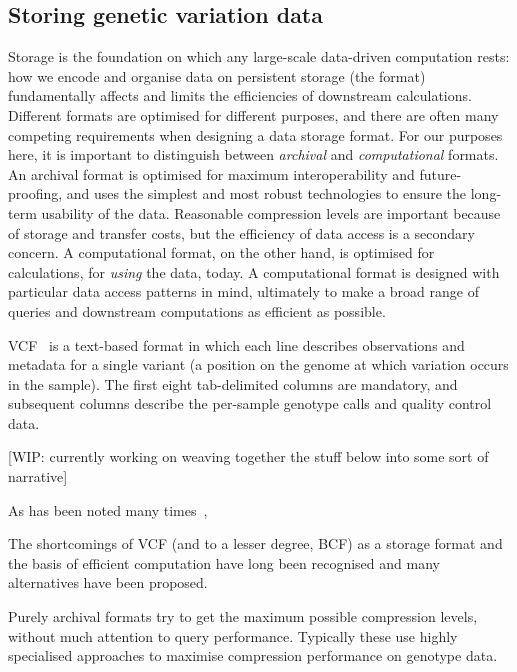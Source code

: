 \documentclass[a4paper,num-refs]{oup-contemporary}
\begin{document}
\subsection{Storing genetic variation data}
Storage is the foundation on which any large-scale data-driven computation
rests: how we encode and organise data on persistent storage (the format)
fundamentally affects and limits the efficiencies of downstream calculations.
Different formats are optimised for different purposes, and there are 
often many competing requirements when designing a data storage format.
For our  purposes here, it is important to distinguish between \emph{archival} 
and \emph{computational} formats. An archival format is optimised for 
maximum interoperability and future-proofing, and uses the simplest and 
most robust technologies to ensure the long-term usability of the data.
Reasonable compression levels are important because 
of storage and transfer costs, but the efficiency of data access is a 
secondary concern. 
A computational format, on the other hand, is optimised 
for calculations, for \emph{using} the data, today. A computational format 
is designed with particular data access patterns in mind, ultimately
to make a broad range of queries and downstream computations as efficient as 
possible.

VCF~\citep{danecek2011variant} is a text-based format in which each line 
describes observations 
and metadata for a single variant (a position on the genome at which
variation occurs in the sample). The first eight tab-delimited 
columns are mandatory, and subsequent columns describe the per-sample 
genotype calls and quality control data.

[WIP: currently working on weaving together the stuff below into
some sort of narrative]

As has been noted many times~\citep[e.g.][]{kelleher2013processing,layer2016efficient,li2016bgt},

The shortcomings of VCF (and to a lesser degree, BCF) as a storage
format and the basis of efficient computation have long been
recognised 
and many alternatives
have been proposed.

Purely archival formats try to get the maximum possible compression levels,
without much attention to query performance. Typically these use
highly specialised approaches to maximise compression performance
on genotype data.
\end{document}
